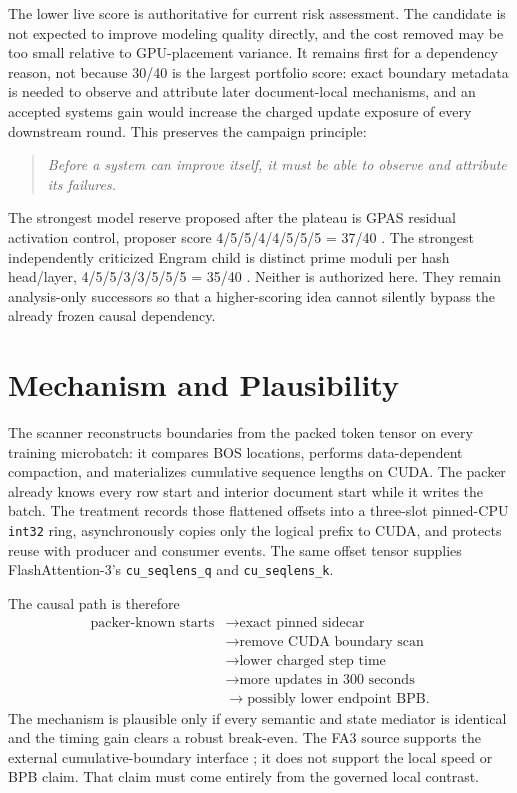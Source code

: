 \documentclass{article}
\begin{document}
The lower live score is authoritative for current risk assessment.  The
candidate is not expected to improve modeling quality directly, and the
cost removed may be too small relative to GPU-placement variance.  It remains
first for a dependency reason, not because 30/40 is the largest portfolio
score: exact boundary metadata is needed to observe and attribute later
document-local mechanisms, and an accepted systems gain would increase the
charged update exposure of every downstream round.  This preserves the
campaign principle:
\begin{quote}
\emph{Before a system can improve itself, it must be able to observe and
attribute its failures.}
\end{quote}

The strongest model reserve proposed after the plateau is GPAS residual
activation control, proposer score
4/5/5/4/4/5/5/5 = 37/40 \cite{gpas2025}.  The strongest independently
criticized Engram child is distinct prime moduli per hash head/layer,
4/5/5/3/3/5/5/5 = 35/40 \cite{engram2026}.  Neither is authorized here.
They remain analysis-only successors so that a higher-scoring idea cannot
silently bypass the already frozen causal dependency.

\section{Mechanism and Plausibility}

The scanner reconstructs boundaries from the packed token tensor on every
training microbatch: it compares BOS locations, performs data-dependent
compaction, and materializes cumulative sequence lengths on CUDA.  The
packer already knows every row start and interior document start while it
writes the batch.  The treatment records those flattened offsets into a
three-slot pinned-CPU \texttt{int32} ring, asynchronously copies only the
logical prefix to CUDA, and protects reuse with producer and consumer events.
The same offset tensor supplies FlashAttention-3's
\texttt{cu\_seqlens\_q} and \texttt{cu\_seqlens\_k}.

The causal path is therefore
\[
\begin{aligned}
\text{packer-known starts}
&\rightarrow \text{exact pinned sidecar}\\
&\rightarrow \text{remove CUDA boundary scan}\\
&\rightarrow \text{lower charged step time}\\
&\rightarrow \text{more updates in 300 seconds}\\
&\rightarrow \text{possibly lower endpoint BPB}.
\end{aligned}
\]
The mechanism is plausible only if every semantic and state mediator is
identical and the timing gain clears a robust break-even.  The FA3 source
supports the external cumulative-boundary interface \cite{fa3}; it does not
support the local speed or BPB claim.  That claim must come entirely from
the governed local contrast.
\end{document}
